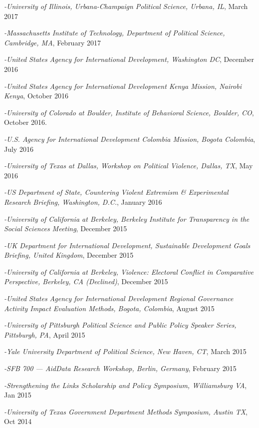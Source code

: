 \documentclass[10pt]{article}
\begin{document}
\begin{etaremune}
\item\textit{-University of Illinois, Urbana-Champaign Political Science, Urbana, IL}, March 2017
\item \textit{-Massachusetts Institute of Technology, Department of Political Science, Cambridge, MA}, February 2017
\item\textit{-United States Agency for International Development, Washington DC}, December 2016
\item\textit{-United States Agency for International Development Kenya Mission, Nairobi Kenya}, October 2016
\item\textit{-University of Colorado at Boulder, Institute of Behavioral Science, Boulder, CO}, October 2016.
\item\textit{-U.S. Agency for International Development Colombia Mission, Bogota Colombia}, July 2016
\item\textit{-University of Texas at Dallas, Workshop on Political Violence, Dallas, TX}, May 2016
\item\textit{-US Department of State, Countering Violent Extremism \& Experimental Research Briefing, Washington, D.C.}, January 2016
\item\textit{-University of California at Berkeley, Berkeley Institute for Transparency in the Social Sciences Meeting}, December 2015
\item\textit{-UK Department for International Development, Sustainable Development Goals Briefing, United Kingdom}, December 2015
\item\textit{-University of California at Berkeley, Violence: Electoral Conflict in Comparative Perspective, Berkeley, CA (Declined)}, December 2015
\item\textit{-United States Agency for International Development Regional Governance Activity Impact Evaluation Methods, Bogota, Colombia}, August 2015
\item\textit{-University of Pittsburgh Political Science and Public Policy Speaker Series, Pittsburgh, PA}, April 2015
\item\textit{-Yale University Department of Political Science, New Haven, CT}, March 2015
\item\textit{-SFB 700 --- AidData Research Workshop, Berlin, Germany}, February 2015
\item\textit{-Strengthening the Links Scholarship and Policy Symposium, Williamsburg VA}, Jan 2015
\item\textit{-University of Texas Government Department Methods Symposium, Austin TX}, Oct 2014

\end{etaremune}
\end{document}
